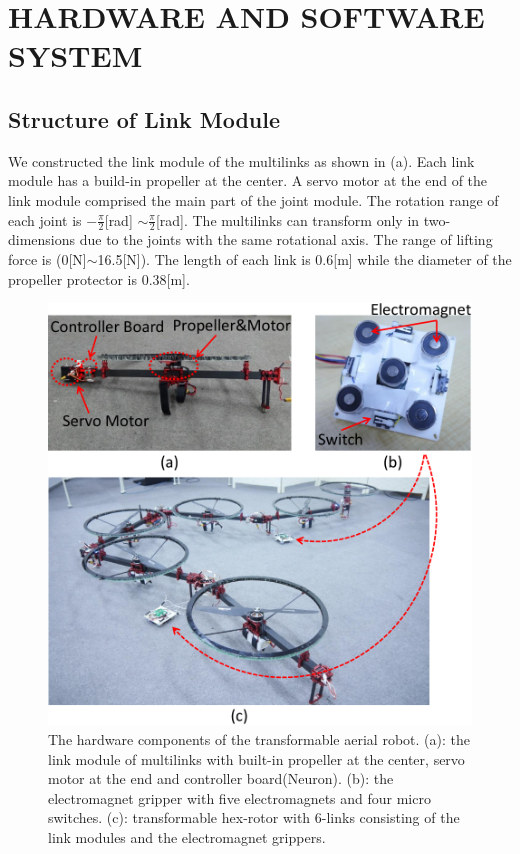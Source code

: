 \section{HARDWARE AND SOFTWARE SYSTEM}
\subsection{Structure of Link Module}
We constructed the link module of the multilinks as shown in (a). Each link module has a build-in propeller at the center. A servo motor at the end of the link module comprised the main part of the joint module. The rotation range of each joint is $-\frac{\pi}{2}$[rad] $\sim \frac{\pi}{2}$[rad]. The multilinks can transform only in two-dimensions due to the joints with the same rotational axis. The range of lifting force is (0[N]$\sim$16.5[N]). The length of each link is 0.6[m] while the diameter of the propeller protector is 0.38[m]. 
 \begin{figure}[t]
  \begin{center}
    \includegraphics[width=1.0\columnwidth]{figs/hardware.pdf}
  \end{center}
  \caption{The hardware components of the transformable aerial robot. (a): the link module of multilinks with built-in propeller at the center, servo motor at the end and controller board(Neuron). (b): the electromagnet gripper with five electromagnets and four micro switches. (c): transformable hex-rotor with 6-links consisting of the link modules and the electromagnet grippers. \label{figure:hardware}}
\end{figure}

